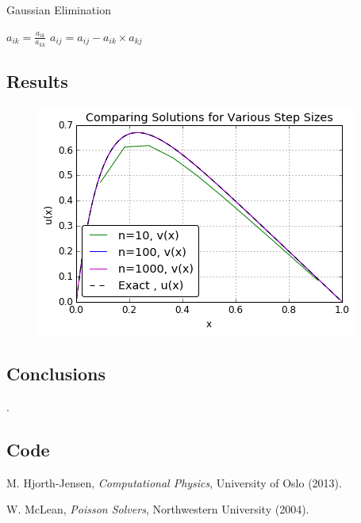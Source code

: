 \documentclass[11pt]{article}
\begin{document}
    \begin{algorithm}
    \caption{Gaussian Elimination}
    \label{CHalgorithm}
    \begin{algorithmic}[1]
    \State $a_{ik} = \frac{a_{ik}}{a_{kk}}$
    \State $a_{ij}=a_{ij}-a_{ik}\times a_{kj}$
    \EndFor
    \EndFor
    \EndFor
    \EndFunction
    \end{algorithmic}
    \end{algorithm}

\subsection{Results}

    \begin{figure}[h!] \begin{center}
    \includegraphics{setpsizechange.png}
    \end{center}  \end{figure}

\subsection{Conclusions}

    .

\subsection{Code}

    

    

\begin{thebibliography}{1}

     M. Hjorth-Jensen, {\em Computational Physics}, University of Oslo (2013).

     W. McLean, {\em Poisson Solvers}, Northwestern University (2004).

\end{thebibliography}
\end{document}
